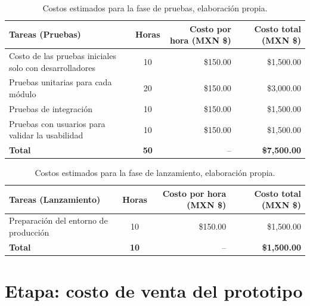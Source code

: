 \begin{table}[H]
	\centering
	\renewcommand{\arraystretch}{1.6}
	\setlength{\tabcolsep}{10pt}
	\Huge
	\begin{adjustbox}{max width=\textwidth}
		\begin{tabular}{|p{9.5cm}|c|r|r|}
			\hline
			\textbf{Tareas (Pruebas)} & \textbf{Horas} & \textbf{Costo por hora (MXN \$)} & \textbf{Costo total (MXN \$)} \\ \hline
			Costo de las pruebas iniciales solo con desarrolladores & 10 & \$150.00 & \$1,500.00 \\ \hline
			Pruebas unitarias para cada módulo & 20 & \$150.00 & \$3,000.00 \\ \hline
			Pruebas de integración & 10 & \$150.00 & \$1,500.00 \\ \hline
			Pruebas con usuarios para validar la usabilidad & 10 & \$150.00 & \$1,500.00 \\ \hline
			\textbf{Total} & \textbf{50} & -- & \textbf{\$7,500.00} \\ \hline
		\end{tabular}
	\end{adjustbox}
	\caption[Costos estimados para la fase de pruebas]{Costos estimados para la fase de pruebas, elaboración propia.} 	
	\label{tab:costos_pruebas_nuevo}
\end{table}

\begin{table}[H]
	\centering
	\renewcommand{\arraystretch}{1.6}
	\setlength{\tabcolsep}{10pt}
	\Huge
	\begin{adjustbox}{max width=\textwidth}
		\begin{tabular}{|p{9.5cm}|c|r|r|}
			\hline
			\textbf{Tareas (Lanzamiento)} & \textbf{Horas} & \textbf{Costo por hora (MXN \$)} & \textbf{Costo total (MXN \$)} \\ \hline
			Preparación del entorno de producción & 10 & \$150.00 & \$1,500.00 \\ \hline
			\textbf{Total} & \textbf{10} & -- & \textbf{\$1,500.00} \\ \hline
		\end{tabular}
	\end{adjustbox}
	\caption[Costos estimados para la fase de lanzamiento]{Costos estimados para la fase de lanzamiento, elaboración propia.} 	
	\label{tab:costos_lanzamiento_nuevo}
\end{table}


\section{Etapa: costo de venta del prototipo}

